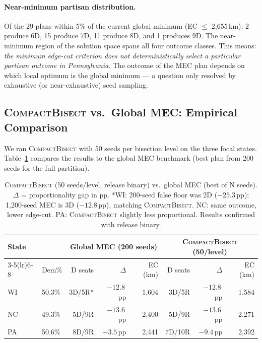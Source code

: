 \paragraph{Near-minimum partisan distribution.}
Of the 29 plans within 5\% of the current global minimum (EC $\leq$ 2{,}655\,km):
2 produce 6D, 15 produce 7D, 11 produce 8D, and 1 produces 9D. The near-minimum
region of the solution space spans all four outcome classes. This means:
\emph{the minimum edge-cut criterion does not deterministically select a
particular partisan outcome in Pennsylvania}. The outcome of the MEC plan
depends on which local optimum is the global minimum --- a question only
resolved by exhaustive (or near-exhaustive) seed sampling.

\subsection{\textsc{CompactBisect} vs.\ Global MEC: Empirical Comparison}
\label{sec:eval:compactbisect}

We ran \textsc{CompactBisect} with 50 seeds per bisection level on the three
focal states. Table~\ref{tab:compactbisect-vs-mec} compares the results to
the global MEC benchmark (best plan from 200 seeds for the full partition).

\begin{table}[h]
\centering
\begin{tabular}{llrrrrrr}
\toprule
State & & \multicolumn{3}{c}{Global MEC (200 seeds)} & \multicolumn{3}{c}{\textsc{CompactBisect} (50/level)} \\
\cmidrule(lr){3-5}\cmidrule(lr){6-8}
& Dem\% & D seats & $\Delta$ & EC (km) & D seats & $\Delta$ & EC (km) \\
\midrule
WI & 50.3\% & 3D/5R* & $-12.8$\,pp & 1{,}604 & 3D/5R & $-12.8$\,pp & 1{,}584 \\
NC & 49.3\% & 5D/9R & $-13.6$\,pp & 2{,}400 & 5D/9R & $-13.6$\,pp & 2{,}271 \\
PA & 50.6\% & 8D/9R & $-3.5$\,pp  & 2{,}441 & 7D/10R & $-9.4$\,pp & 2{,}392 \\
\bottomrule
\end{tabular}
\caption{\textsc{CompactBisect} (50 seeds/level, release binary) vs.\ global MEC
  (best of N seeds). $\Delta$ = proportionality gap in pp.
  *WI: 200-seed false floor was 2D ($-25.3$\,pp); 1{,}200-seed MEC is 3D ($-12.8$\,pp),
  matching \textsc{CompactBisect}. NC: same outcome, lower edge-cut.
  PA: \textsc{CompactBisect} slightly less proportional. Results confirmed with release binary.}
\label{tab:compactbisect-vs-mec}
\end{table}

